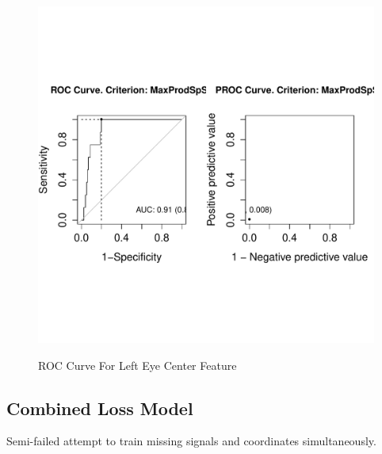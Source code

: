 \documentclass[journal]{IEEEtran}
\begin{document}
\begin{figure}[!htb]
  \centering
  \caption{ROC Curve For Left Eye Center Feature}
  \includegraphics[scale=.5]{roc_left_eye_center.pdf}
  \label{fig:roc_left_eye_center}
\end{figure}




\subsection{Combined Loss Model}
Semi-failed attempt to train missing signals and coordinates simultaneously.
\end{document}
